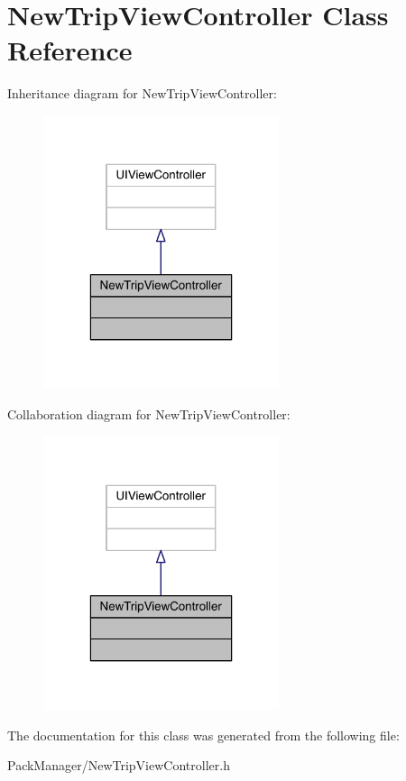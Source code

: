 \hypertarget{interface_new_trip_view_controller}{\section{New\-Trip\-View\-Controller Class Reference}
\label{interface_new_trip_view_controller}
}


Inheritance diagram for New\-Trip\-View\-Controller\-:\nopagebreak
\begin{figure}[H]
\begin{center}
\leavevmode
\includegraphics[width=196pt]{interface_new_trip_view_controller__inherit__graph}
\end{center}
\end{figure}


Collaboration diagram for New\-Trip\-View\-Controller\-:\nopagebreak
\begin{figure}[H]
\begin{center}
\leavevmode
\includegraphics[width=196pt]{interface_new_trip_view_controller__coll__graph}
\end{center}
\end{figure}


The documentation for this class was generated from the following file\-:\begin{DoxyCompactItemize}
\item 
Pack\-Manager/New\-Trip\-View\-Controller.\-h\end{DoxyCompactItemize}
